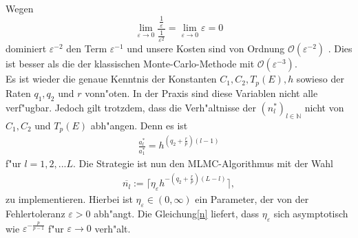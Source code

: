 Wegen
\begin{equation*}
\lim_{\varepsilon\rightarrow 0} \frac{\frac{1}{\varepsilon}}{\frac{1}{\varepsilon^2}}=\lim_{\varepsilon\rightarrow 0} \varepsilon=0
\end{equation*}
dominiert $\varepsilon^{-2}$ den Term $\varepsilon^{-1}$  und
unsere Kosten sind von Ordnung $\mathcal{O}(\varepsilon^{-2})$ . Dies ist besser als die der klassischen Monte-Carlo-Methode mit $\mathcal{O}(\varepsilon^{-3})$.\\[0,2cm]
Es ist wieder die genaue Kenntnis der Konstanten $C_1,C_2,T_p(E),h$ sowieso der Raten $q_1,q_2$ und $r$ vonn"oten. In der Praxis sind diese Variablen nicht alle verf"ugbar. Jedoch gilt trotzdem, dass die Verh"altnisse der $(n_l^*)_{l\in\mathbb{N}}$  nicht von $C_1,C_2$ und $T_p(E)$ abh"angen. Denn es ist
\begin{align*}
\frac{a_l^*}{a_1^*}=h^{(q_2+\frac{r}{p})(l-1)} 
\end{align*} f"ur $l=1,2,...L$.
Die Strategie ist nun den MLMC-Algorithmus mit der Wahl
\begin{align*}
\overline{n_l}:=\lceil \eta_\varepsilon h^{-(q_2+\frac{r}{p})(L-l)} \rceil,
\end{align*}
zu implementieren.
Hierbei ist $\eta_\varepsilon\in (0,\infty)$ ein Parameter, der von der Fehlertoleranz $\varepsilon>0$ abh"angt. Die Gleichung\eqref{n} liefert, dass $\eta_\varepsilon$ sich asymptotisch wie $\varepsilon^{-\frac{p}{p-1}}$ f"ur $\varepsilon\rightarrow0$ verh"alt.